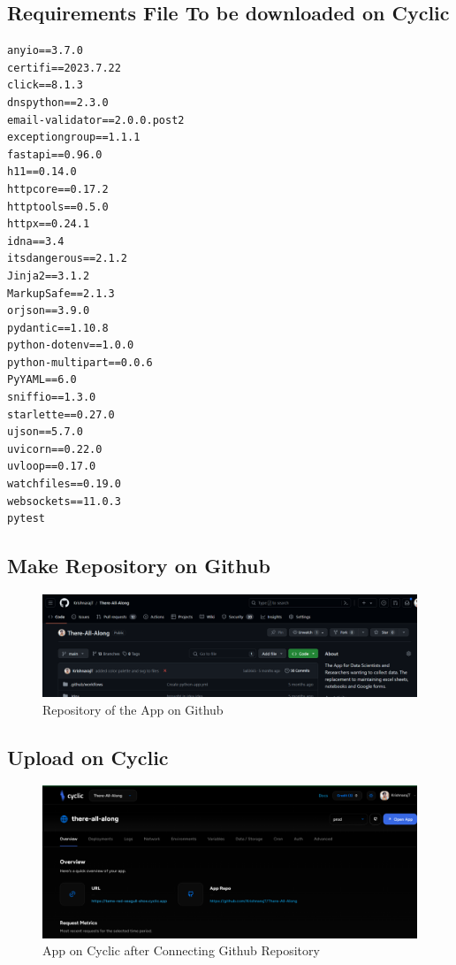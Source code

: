 \documentclass[11pt]{article}
\begin{document}
\subsection{Requirements File To be downloaded on Cyclic}
\begin{lstlisting}
anyio==3.7.0
certifi==2023.7.22
click==8.1.3
dnspython==2.3.0
email-validator==2.0.0.post2
exceptiongroup==1.1.1
fastapi==0.96.0
h11==0.14.0
httpcore==0.17.2
httptools==0.5.0
httpx==0.24.1
idna==3.4
itsdangerous==2.1.2
Jinja2==3.1.2
MarkupSafe==2.1.3
orjson==3.9.0
pydantic==1.10.8
python-dotenv==1.0.0
python-multipart==0.0.6
PyYAML==6.0
sniffio==1.3.0
starlette==0.27.0
ujson==5.7.0
uvicorn==0.22.0
uvloop==0.17.0
watchfiles==0.19.0
websockets==11.0.3
pytest

\end{lstlisting}

\subsection{Make Repository on Github}
\begin{figure}[H]
    \centering
    \includegraphics[width=.95\textwidth]{github.png}
    \caption{Repository of the App on Github}
\end{figure}
\subsection{Upload on Cyclic}
\begin{figure}[H]
    \centering
    \includegraphics[width=.95\textwidth]{cyclic home.png}
    \caption{App on Cyclic after Connecting Github Repository}
\end{figure}
\end{document}
